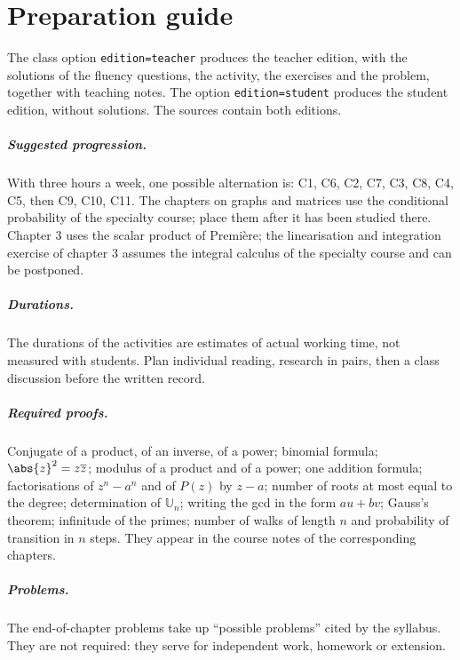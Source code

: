 \chapter*{Preparation guide}
\begin{teachernote}
The class option \texttt{edition=teacher} produces the teacher edition, with the solutions of the fluency questions, the activity, the exercises and the problem, together with teaching notes. The option \texttt{edition=student} produces the student edition, without solutions. The sources contain both editions.
\end{teachernote}
\paragraph{Suggested progression.} With three hours a week, one possible alternation is: C1, C6, C2, C7, C3, C8, C4, C5, then C9, C10, C11. The chapters on graphs and matrices use the conditional probability of the specialty course; place them after it has been studied there. Chapter 3 uses the scalar product of Première; the linearisation and integration exercise of chapter 3 assumes the integral calculus of the specialty course and can be postponed.
\paragraph{Durations.} The durations of the activities are estimates of actual working time, not measured with students. Plan individual reading, research in pairs, then a class discussion before the written record.
\paragraph{Required proofs.} Conjugate of a product, of an inverse, of a power; binomial formula; $\abs{z}^2=z\overline{z}$; modulus of a product and of a power; one addition formula; factorisations of $z^n-a^n$ and of $P(z)$ by $z-a$; number of roots at most equal to the degree; determination of $\mathbb{U}_n$; writing the gcd in the form $au+bv$; Gauss's theorem; infinitude of the primes; number of walks of length $n$ and probability of transition in $n$ steps. They appear in the course notes of the corresponding chapters.
\paragraph{Problems.} The end-of-chapter problems take up ``possible problems'' cited by the syllabus. They are not required: they serve for independent work, homework or extension.
\fi
\tableofcontents
\mainmatter

